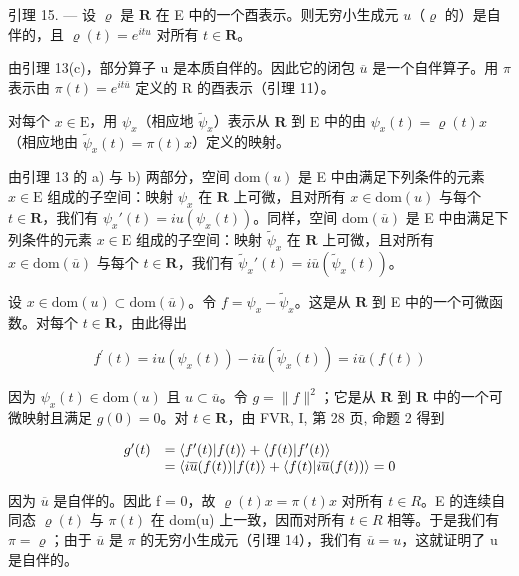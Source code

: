 引理 15. --- 设 \(\varrho\) 是 \(\mathbf{R}\) 在 E 中的一个酉表示。则无穷小生成元 \(u\)（\(\varrho\) 的）是自伴的，且 \(\varrho(t) = e^{itu}\) 对所有 \(t \in \mathbf{R}\)。

由引理 13(c)，部分算子 u 是本质自伴的。因此它的闭包 \(\overline{u}\) 是一个自伴算子。用 \(\pi\) 表示由 \(\pi(t) = e^{it\overline{u}}\) 定义的 R 的酉表示（引理 11）。

对每个 \(x \in \mathrm{E}\)，用 \(\psi_x\)（相应地 \(\widetilde{\psi}_x\)）表示从 \(\mathbf{R}\) 到 \(\mathrm{E}\) 中的由 \(\psi_x(t) = \varrho(t)x\)（相应地由 \(\widetilde{\psi}_x(t) = \pi(t)x\)）定义的映射。

由引理 13 的 a) 与 b) 两部分，空间 \(\mathrm{dom}(u)\) 是 E 中由满足下列条件的元素 \(x \in \mathrm{E}\) 组成的子空间：映射 \(\psi_x\) 在 \(\mathbf{R}\) 上可微，且对所有 \(x \in \mathrm{dom}(u)\) 与每个 \(t \in \mathbf{R}\)，我们有 \(\psi_x'(t) = i u (\psi_x(t))\)。同样，空间 \(\mathrm{dom}(\overline{u})\) 是 E 中由满足下列条件的元素 \(x \in \mathrm{E}\) 组成的子空间：映射 \(\widetilde{\psi}_x\) 在 \(\mathbf{R}\) 上可微，且对所有 \(x \in \mathrm{dom}(\overline{u})\) 与每个 \(t \in \mathbf{R}\)，我们有 \(\widetilde{\psi}_x'(t) = i \overline{u} (\widetilde{\psi}_x(t))\)。

设 \(x \in \text{dom}(u) \subset \text{dom}(\overline{u})\)。令 \(f = \psi_x - \widetilde{\psi}_x\)。这是从 \(\mathbf{R}\) 到 E 中的一个可微函数。对每个 \(t \in \mathbf{R}\)，由此得出

\[
f ^ {\prime} (t) = i u (\psi_ {x} (t)) - i \overline {{u}} (\widetilde {\psi} _ {x} (t)) = i \overline {{u}} (f (t))
\]

因为 \(\psi_x(t) \in \mathrm{dom}(u)\) 且 \(u \subset \overline{u}\)。令 \(g = \|f\|^2\)；它是从 \(\mathbf{R}\) 到 \(\mathbf{R}\) 中的一个可微映射且满足 \(g(0) = 0\)。对 \(t \in \mathbf{R}\)，由 FVR, I, 第 28 页, 命题 2 得到

\[
\begin{array}{r l} g ^ {\prime} (t) & = \langle f ^ {\prime} (t) | f (t) \rangle + \langle f (t) | f ^ {\prime} (t) \rangle \\ & = \langle i \overline {{u}} (f (t)) | f (t) \rangle + \langle f (t) | i \overline {{u}} (f (t)) \rangle = 0 \end{array}
\]

因为 \(\overline{u}\) 是自伴的。因此 f = 0，故 \(\varrho(t)x = \pi(t)x\) 对所有 \(t \in R\)。E 的连续自同态 \(\varrho(t)\) 与 \(\pi(t)\) 在 dom(u) 上一致，因而对所有 \(t \in R\) 相等。于是我们有 \(\pi = \varrho\)；由于 \(\overline{u}\) 是 \(\pi\) 的无穷小生成元（引理 14），我们有 \(\overline{u} = u\)，这就证明了 u 是自伴的。

